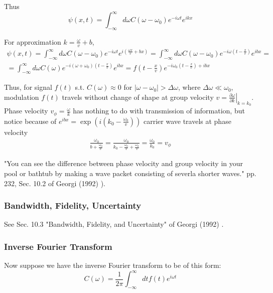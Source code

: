 Thus
\[
\psi(x,t) = \int_{-\infty}^{\infty} d\omega C(\omega - \omega_0) e^{-i\omega t} e^{ikx}
\]

For approximation $k = \frac{\omega }{v} + b$, 
\[
\begin{gathered}
\psi(x,t) = \int_{-\infty}^{\infty} d\omega C(\omega - \omega_0) e^{-i\omega t} e^{ i \left( \frac{\omega x}{v} + bx \right) } = \int_{-\infty}^{\infty} d\omega C(\omega - \omega_0) e^{ -i \omega \left( t - \frac{x}{v} \right) } e^{ibx } = \\
= \int_{-\infty}^{\infty} d\omega C(\omega) e^{-i (\omega + \omega_0) \left( t - \frac{x}{v} \right) } e^{ibx} = f(t - \frac{x}{v})	 e^{-i \omega_0 (t - \frac{x}{v} ) + ibx}
\end{gathered}
\]

Thus, for signal $f(t)$ s.t. $C(\omega) \approx 0$ for $| \omega - \omega_0| > \Delta \omega$, where $\Delta \omega \ll \omega_0$, \\
modulation $f(t)$ travels without change of shape at group velocity $v = \left. \frac{ \partial \omega}{ \partial k } \right|_{k=k_0}$. \\
Phase velocity $v_{\phi} = \frac{\omega}{k}$ has nothing to do with transmission of information, but notice because of $e^{ibx} = \exp{ \left( i \left( k_0 - \frac{ \omega_0}{v} \right) \right) }$ carrier wave travels at phase velocity
\[
\begin{gathered}
	\frac{ \omega_0 }{ b + \frac{\omega_0}{v} } = \frac{ \omega_0}{ k_0 - \frac{\omega_0}{v} + \frac{\omega_0}{v} } = \frac{\omega_0}{k_0} = v_{\phi}
\end{gathered}
\]

"You can see the difference between phase velocity and group velocity in your pool or bathtub by making a wave packet consisting of severla shorter waves." pp. 232, Sec. 10.2 of Georgi (1992) \cite{dgdt:Geor1992}).

\subsubsection{Bandwidth, Fidelity, Uncertainty}

See Sec. 10.3 "Bandwidth, Fidelity, and Uncertainty" of Georgi (1992) \cite{dgdt:Geor1992}.

\subsubsection{Inverse Fourier Transform}

Now suppose we have the inverse Fourier transform to be of this form:
\begin{equation}\label{dgdt:Eq:InverseFourierTransform}
C(\omega) = \frac{1}{ 2\pi} \int_{-\infty}^{\infty} dt f(t) e^{i\omega t}
\end{equation}

